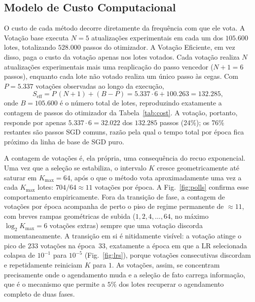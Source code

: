 \documentclass[conference]{IEEEtran}
\begin{document}
\subsection{Modelo de Custo Computacional}
\label{sec:cost}

O custo de cada método decorre diretamente da frequência com que ele vota. A Votação base executa $N = 5$ atualizações experimentais em cada um dos $105{.}600$ lotes, totalizando $528{.}000$ passos do otimizador. A Votação Eficiente, em vez disso, paga o custo da votação apenas nos lotes votados. Cada votação realiza $N$ atualizações experimentais mais uma reaplicação do passo vencedor ($N + 1 = 6$ passos), enquanto cada lote não votado realiza um único passo às cegas. Com $P = 5{.}337$ votações observadas ao longo da execução,
\begin{equation}
S_{\mathrm{eff}} = P\,(N+1) + (B - P) = 5{.}337 \cdot 6 + 100{.}263 = 132{.}285,
\label{eq:cost}
\end{equation}
onde $B = 105{.}600$ é o número total de lotes, reproduzindo exatamente a contagem de passos do otimizador da Tabela~\ref{tab:cost}. A votação, portanto, responde por apenas $5{.}337 \cdot 6 = 32{.}022$ dos $132{.}285$ passos (24\%); os 76\% restantes são passos SGD comuns, razão pela qual o tempo total por época fica próximo da linha de base de SGD puro.

A contagem de votações é, ela própria, uma consequência do recuo exponencial. Uma vez que a seleção se estabiliza, o intervalo $K$ cresce geometricamente até saturar em $K_{\max} = 64$, após o que o método vota aproximadamente uma vez a cada $K_{\max}$ lotes: $704 / 64 \approx 11$ votações por época. A Fig.~\ref{fig:polls} confirma esse comportamento empiricamente. Fora da transição de fase, a contagem de votações por época acompanha de perto o piso de regime permanente de $\approx 11$, com breves rampas geométricas de subida ($1, 2, 4, \ldots, 64$, no máximo $\log_2 K_{\max} = 6$ votações extras) sempre que uma votação discorda momentaneamente. A transição em si é nitidamente visível: a votação atinge o pico de $233$ votações na época~33, exatamente a época em que a LR selecionada colapsa de $10^{-1}$ para $10^{-5}$ (Fig.~\ref{fig:lrs}), porque votações consecutivas discordam e repetidamente reiniciam $K$ para $1$. As votações, assim, se concentram precisamente onde o agendamento muda e a seleção de fato carrega informação, que é o mecanismo que permite a $5\%$ dos lotes recuperar o agendamento completo de duas fases.
\end{document}
